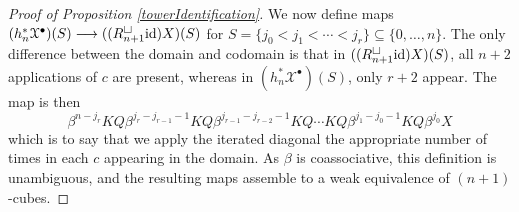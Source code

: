 \documentclass[11pt]{amsart} \renewcommand{\baselinestretch}{1.2}
\theoremstyle{plain}
\numberwithin{equation}{section} %
\theoremstyle{plain}
\numberwithin{equation}{chapter} %
\renewcommand{\to}{\longrightarrow}
\newcommand{\calx}{\mathcal{X}}
\newcommand{\Id}{\mathrm{id}}
\newcommand{\plainD}{R}
\begin{document}
\begin{Bousfield-Kan spectral sequence}
\begin{proof}[Proof of Proposition \ref{towerIdentification}]
We now define maps $(h_n^*\calx^\bullet)(S)\to (({\plainD}_{n+1}^{\smash{\square}}\Id )X)(S)$ for $S=\{j_0<j_1<\cdots<j_r\}\subseteq\{0,\ldots,n\}$. 
The only difference between the domain and codomain is that in $(({\plainD}_{n+1}^{\smash{\square}}\Id )X)(S)$, all $n+2$ applications of $c$ are present, whereas in $(h_n^*\calx^\bullet)(S)$, only $r+2$ appear. The map is then
\[\beta^{n-j_r}KQ\beta^{j_r-j_{r-1}-1}KQ\beta^{j_{r-1}-j_{r-2}-1}KQ\cdots KQ\beta^{j_{1}-j_0-1}KQ\beta^{j_0}X\]
which is to say that we apply the iterated diagonal the appropriate number of times in each $c$ appearing in the domain. As $\beta$ is coassociative, this definition is unambiguous, and the resulting maps assemble to a weak equivalence of $(n+1)$-cubes. 
\end{proof}




\end{Bousfield-Kan spectral sequence}
\end{document}
